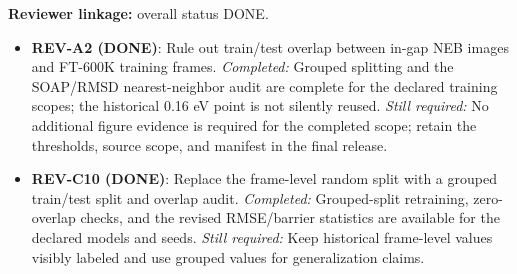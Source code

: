 \textbf{Reviewer linkage:} overall status DONE.
\begin{itemize}[leftmargin=1.4em,noitemsep]
\item \textbf{REV-A2 (DONE)}: Rule out train/test overlap between in-gap NEB images and FT-600K training frames. \emph{Completed:} Grouped splitting and the SOAP/RMSD nearest-neighbor audit are complete for the declared training scopes; the historical 0.16 eV point is not silently reused. \emph{Still required:} No additional figure evidence is required for the completed scope; retain the thresholds, source scope, and manifest in the final release.
\item \textbf{REV-C10 (DONE)}: Replace the frame-level random split with a grouped train/test split and overlap audit. \emph{Completed:} Grouped-split retraining, zero-overlap checks, and the revised RMSE/barrier statistics are available for the declared models and seeds. \emph{Still required:} Keep historical frame-level values visibly labeled and use grouped values for generalization claims.
\end{itemize}
